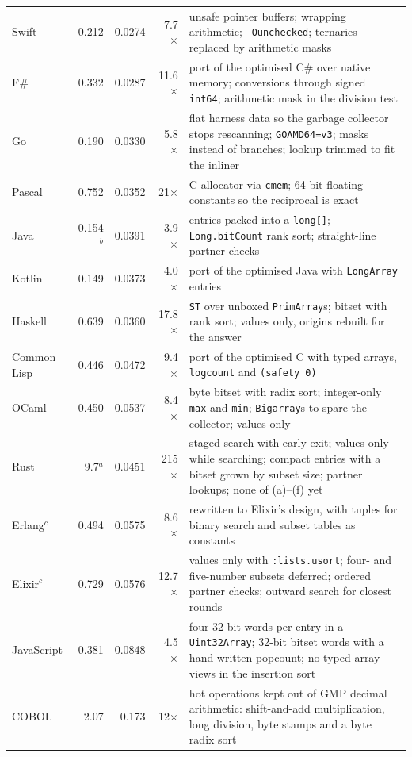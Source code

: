\documentclass[11pt,a4paper]{article}
\theoremstyle{definition}
\theoremstyle{remark}
\begin{document}
\begin{table}[p]
\begin{tabular}{@{}lrrrp{9.5cm}@{}}
Swift & 0.212 & 0.0274 & 7.7$\times$ & unsafe pointer buffers; wrapping arithmetic; \texttt{-Ounchecked}; ternaries replaced by arithmetic masks \\
F\# & 0.332 & 0.0287 & 11.6$\times$ & port of the optimised C\# over native memory; conversions through signed \texttt{int64}; arithmetic mask in the division test \\
Go & 0.190 & 0.0330 & 5.8$\times$ & flat harness data so the garbage collector stops rescanning; \texttt{GOAMD64=v3}; masks instead of branches; lookup trimmed to fit the inliner \\
Pascal & 0.752 & 0.0352 & 21$\times$ & C allocator via \texttt{cmem}; 64-bit floating constants so the reciprocal is exact \\
Java & 0.154$^b$ & 0.0391 & 3.9$\times$ & entries packed into a \texttt{long[]}; \texttt{Long.bitCount} rank sort; straight-line partner checks \\
Kotlin & 0.149 & 0.0373 & 4.0$\times$ & port of the optimised Java with \texttt{LongArray} entries \\
Haskell & 0.639 & 0.0360 & 17.8$\times$ & \texttt{ST} over unboxed \texttt{PrimArray}s; bitset with rank sort; values only, origins rebuilt for the answer \\
Common Lisp & 0.446 & 0.0472 & 9.4$\times$ & port of the optimised C with typed arrays, \texttt{logcount} and \texttt{(safety 0)} \\
OCaml & 0.450 & 0.0537 & 8.4$\times$ & byte bitset with radix sort; integer-only \texttt{max} and \texttt{min}; \texttt{Bigarray}s to spare the collector; values only \\
Rust & 9.7$^a$ & 0.0451 & 215$\times$ & staged search with early exit; values only while searching; compact entries with a bitset grown by subset size; partner lookups; none of (a)--(f) yet \\
Erlang$^c$ & 0.494 & 0.0575 & 8.6$\times$ & rewritten to Elixir's design, with tuples for binary search and subset tables as constants \\
Elixir$^c$ & 0.729 & 0.0576 & 12.7$\times$ & values only with \texttt{:lists.usort}; four- and five-number subsets deferred; ordered partner checks; outward search for closest rounds \\
JavaScript & 0.381 & 0.0848 & 4.5$\times$ & four 32-bit words per entry in a \texttt{Uint32Array}; 32-bit bitset words with a hand-written popcount; no typed-array views in the insertion sort \\
COBOL & 2.07 & 0.173 & 12$\times$ & hot operations kept out of GMP decimal arithmetic: shift-and-add multiplication, long division, byte stamps and a byte radix sort \\

\end{tabular}
\end{table}
\end{document}
